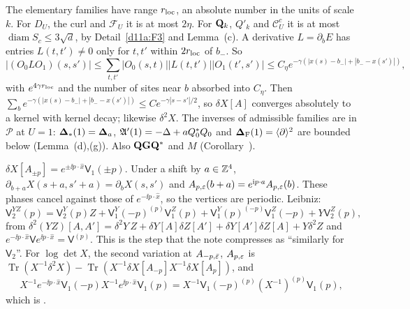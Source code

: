 \begin{detail}\label{d11a:F4}
\begin{step}[Locality]
The elementary families have range $r_{\rm loc}$, an absolute number in the units of scale $k$. For $D_U$, the curl and $\mathcal F_U$ it is at most $2\eta$. For $\mathbf Q_k$, $Q'_k$ and $\mathcal C^c_U$ it is at most $\operatorname{diam}S_c\le3\sqrt d$, by Detail~\ref{d11a:F3} and Lemma~(c). A derivative $L=\partial_bE$ has entries $L(t,t')\ne0$ only for $t,t'$ within $2r_{\rm loc}$ of $b_-$. So
\[
|(O_0LO_1)(s,s')|\le\sum_{t,t'}|O_0(s,t)||L(t,t')||O_1(t',s')|\le C_\eta e^{-\gamma(|x(s)-b_-|+|b_--x(s')|)},
\]
with $e^{4\gamma r_{\rm loc}}$ and the number of sites near $b$ absorbed into $C_\eta$. Then $\sum_be^{-\gamma(|x(s)-b_-|+|b_--x(s')|)}\le Ce^{-\gamma|s-s'|/2}$, so $\delta X[A]$ converges absolutely to a kernel with kernel decay; likewise $\delta^2X$. The inverses of admissible families are in $\mathscr P$ at $U=1$: $\boldsymbol{\Delta}_*(1)=\boldsymbol{\Delta}_a$, $\mathfrak A'(1)=-\Delta+aQ_0^*Q_0$ and $\boldsymbol{\Delta}_{\rm F}(1)=\langle\partial\rangle^2$ are bounded below (Lemma~(d),(g)). Also $\mathbf Q\mathbf G\mathbf Q^*$ and $M$ (Corollary~).
\end{step}
\begin{step}[Vertices]
$\delta X[A_{\pm p}]=e^{\pm\ii p\cdot\hat x}\mathsf V_1(\pm p)$. Under a shift by $a\in\mathbb Z^4$, $\partial_{b+a}X(s+a,s'+a)=\partial_bX(s,s')$ and $A_{p,\varepsilon}(b+a)=e^{\mathrm i p\cdot a}A_{p,\varepsilon}(b)$. These phases cancel against those of $e^{-\ii p\cdot\hat x}$, so the vertices are periodic. Leibniz:
\[
\mathsf V_2^{YZ}(p)=\mathsf V_2^Y(p)Z+\mathsf V_1^Y(-p)^{(p)}\mathsf V_1^Z(p)+\mathsf V_1^Y(p)^{(-p)}\mathsf V_1^Z(-p)+Y\mathsf V_2^Z(p),
\]
from $\delta^2(YZ)[A,A']=\delta^2Y\,Z+\delta Y[A]\delta Z[A']+\delta Y[A']\delta Z[A]+Y\delta^2Z$ and $e^{-\ii p\cdot\hat x}\mathsf V e^{\ii p\cdot\hat x}=\mathsf V^{(p)}$. This is the step that the note compresses as ``similarly for $\mathsf V_2$''. For $\log\det X$, the second variation at $A_{-p,\bar{\varepsilon}}$, $A_{p,\varepsilon}$ is $\operatorname{Tr}(X^{-1}\delta^2X)-\operatorname{Tr}(X^{-1}\delta X[A_{-p}]X^{-1}\delta X[A_p])$, and
\[
X^{-1}e^{-\ii p\cdot\hat x}\mathsf V_1(-p)X^{-1}e^{\ii p\cdot\hat x}\mathsf V_1(p)=X^{-1}\mathsf V_1(-p)^{(p)}(X^{-1})^{(p)}\mathsf V_1(p),
\]
which is .
\end{step}
\end{detail}

